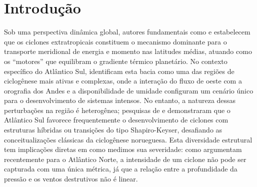 \chapter{Introdução} \label{ch:introduccion}

Sob uma perspectiva dinâmica global, autores fundamentais como \citet{hoskins2002new} e \citet{sinclair1994objective} estabelecem que os ciclones extratropicais constituem o mecanismo dominante para o transporte meridional de energia e momento nas latitudes médias, atuando como os ``motores'' que equilibram o gradiente térmico planetário.
No contexto específico do Atlântico Sul, \citet{reboita2010south} identificam esta bacia como uma das regiões de ciclogênese mais ativas e complexas, onde a interação do fluxo de oeste com a orografia dos Andes e a disponibilidade de umidade configuram um cenário único para o desenvolvimento de sistemas intensos.
No entanto, a natureza dessas perturbações na região é heterogênea; pesquisas de \citet{evans2012climatology} e \citet{gozzo2013air} demonstraram que o Atlântico Sul favorece frequentemente o desenvolvimento de ciclones com estruturas híbridas ou transições do tipo Shapiro-Keyser, desafiando as conceitualizações clássicas da ciclogênese norueguesa.
Esta diversidade estrutural tem implicações diretas em como medimos sua severidade: como argumentam recentemente \citet{corner2025classification} para o Atlântico Norte, a intensidade de um ciclone não pode ser capturada com uma única métrica, já que a relação entre a profundidade da pressão e os ventos destrutivos não é linear.
